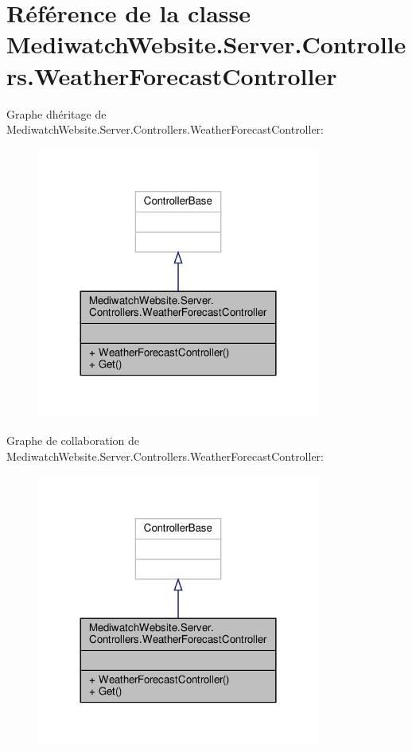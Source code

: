 \hypertarget{class_mediwatch_website_1_1_server_1_1_controllers_1_1_weather_forecast_controller}{}\section{Référence de la classe Mediwatch\+Website.\+Server.\+Controllers.\+Weather\+Forecast\+Controller}
\label{class_mediwatch_website_1_1_server_1_1_controllers_1_1_weather_forecast_controller}


Graphe d\textquotesingle{}héritage de Mediwatch\+Website.\+Server.\+Controllers.\+Weather\+Forecast\+Controller\+:
\nopagebreak
\begin{figure}[H]
\begin{center}
\leavevmode
\includegraphics[width=264pt]{class_mediwatch_website_1_1_server_1_1_controllers_1_1_weather_forecast_controller__inherit__graph}
\end{center}
\end{figure}


Graphe de collaboration de Mediwatch\+Website.\+Server.\+Controllers.\+Weather\+Forecast\+Controller\+:
\nopagebreak
\begin{figure}[H]
\begin{center}
\leavevmode
\includegraphics[width=264pt]{class_mediwatch_website_1_1_server_1_1_controllers_1_1_weather_forecast_controller__coll__graph}
\end{center}
\end{figure}
